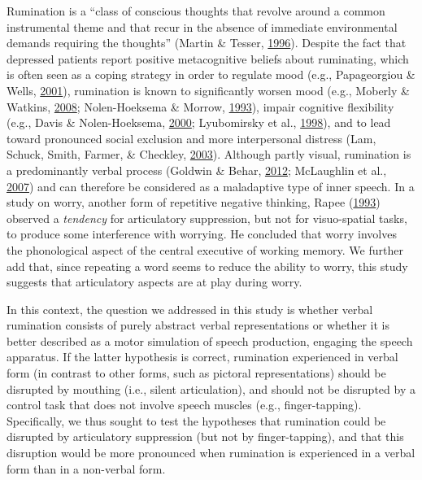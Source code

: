 \documentclass[a4paper,12pt,twoside,onecolumn,openright,final,oldfontcommands]{memoir}
\begin{document}
Rumination is a \enquote{class of conscious thoughts that revolve around a common instrumental theme and that recur in the absence of immediate environmental demands requiring the thoughts} (Martin \& Tesser, \protect\hyperlink{ref-Martin}{1996}). Despite the fact that depressed patients report positive metacognitive beliefs about ruminating, which is often seen as a coping strategy in order to regulate mood (e.g., Papageorgiou \& Wells, \protect\hyperlink{ref-papageorgiou_metacognitive_2001}{2001}), rumination is known to significantly worsen mood (e.g., Moberly \& Watkins, \protect\hyperlink{ref-Moberly2008}{2008}; Nolen-Hoeksema \& Morrow, \protect\hyperlink{ref-nolen-hoeksema_effects_1993}{1993}), impair cognitive flexibility (e.g., Davis \& Nolen-Hoeksema, \protect\hyperlink{ref-Davis2000}{2000}; Lyubomirsky et al., \protect\hyperlink{ref-Lyubomirsky1998}{1998}), and to lead toward pronounced social exclusion and more interpersonal distress (Lam, Schuck, Smith, Farmer, \& Checkley, \protect\hyperlink{ref-lam_response_2003}{2003}). Although partly visual, rumination is a predominantly verbal process (Goldwin \& Behar, \protect\hyperlink{ref-goldwin_concreteness_2012}{2012}; McLaughlin et al., \protect\hyperlink{ref-mclaughlin_effects_2007}{2007}) and can therefore be considered as a maladaptive type of inner speech. In a study on worry, another form of repetitive negative thinking, Rapee (\protect\hyperlink{ref-rapee_utilisation_1993}{1993}) observed a \emph{tendency} for articulatory suppression, but not for visuo-spatial tasks, to produce some interference with worrying. He concluded that worry involves the phonological aspect of the central executive of working memory. We further add that, since repeating a word seems to reduce the ability to worry, this study suggests that articulatory aspects are at play during worry.

In this context, the question we addressed in this study is whether verbal rumination consists of purely abstract verbal representations or whether it is better described as a motor simulation of speech production, engaging the speech apparatus. If the latter hypothesis is correct, rumination experienced in verbal form (in contrast to other forms, such as pictoral representations) should be disrupted by mouthing (i.e., silent articulation), and should not be disrupted by a control task that does not involve speech muscles (e.g., finger-tapping). Specifically, we thus sought to test the hypotheses that rumination could be disrupted by articulatory suppression (but not by finger-tapping), and that this disruption would be more pronounced when rumination is experienced in a verbal form than in a non-verbal form.
\end{document}
